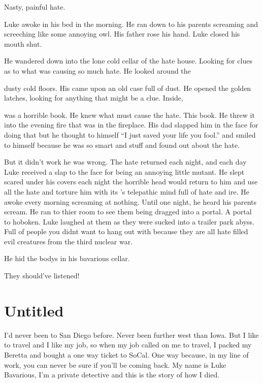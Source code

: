Nasty, painful hate.



Luke awoke in his bed in the morning. He ran down to his parents
screaming and screeching like some annoying owl. His father rose
his hand. Luke closed his mouth shut.



He wandered down into the lone cold cellar of the hate house.
Looking for clues as to what was causing so much hate. He looked
around the

dusty cold floors. His came upon an old case full of dust. He
opened the golden latches, looking for anything that might be a
clue. Inside,

was a horrible book. He knew what must cause the hate. This book.
He threw it into the evening fire that was in the fireplace. His
dad slapped him in the face for doing that but he thought to
himself ``I just saved your life you fool.'' and smiled to himself
because he was so smart and stuff and found out about the
hate.



But it didn't work he was wrong. The hate returned each night, and
each day Luke received a slap to the face for being an annoying
little mutant. He slept scared under his covers each night the
horrible head would return to him and use all the hate and torture
him with its 's telepathic mind full of hate and ire. He awoke
every morning screaming at nothing. Until one night, he heard his
parents scream. He ran to thier room to see them being dragged into
a portal. A portal to hoboken. Luke laughed at them as they were
sucked into a trailer park abyss. Full of people you didnt want to
hang out with because they are all hate filled evil creatures from
the third nuclear war.



He hid the bodys in his bavarious cellar.



They should've listened! 
 



\chapter{Untitled}


I'd never been to San Diego before. Never been further west
than Iowa. But I like to travel and I like my job, so when my job
called on me to travel, I packed my Beretta and bought a one way
ticket to SoCal. One way because, in my line of work, you can never
be sure if you'll be coming back. My name is Luke Bavarious,
I'm a private detective and this is the story of how I died.



